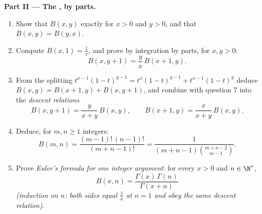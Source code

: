 \begin{problem}
\medskip
\noindent\textbf{Part II --- The , by parts.}
\begin{enumerate}[resume]
  \item Show that $B(x,y)$  exactly for $x > 0$ and $y >
        0$, and that $B(x,y) = B(y,x)$.
  \item Compute $B(x, 1) = \frac1x$, and prove by integration by
        parts, for $x, y > 0$:
        \[
        B(x, y+1) = \frac{y}{x}\,B(x+1, y) .
        \]
  \item From the splitting $t^{x-1}(1-t)^{y-1} =
        t^{x}(1-t)^{y-1} + t^{x-1}(1-t)^{y}$ deduce $B(x,y) =
        B(x+1,y) + B(x,y+1)$, and combine with question 7 into
        the \emph{descent relations}
        \[
        B(x, y+1) = \frac{y}{x+y}\,B(x,y),
        \qquad
        B(x+1, y) = \frac{x}{x+y}\,B(x,y) .
        \]
  \item Deduce, for $m, n \geq 1$ integers:
        \[
        B(m, n) = \frac{(m-1)!\,(n-1)!}{(m+n-1)!}
        = \frac{1}{(m+n-1)\binom{m+n-2}{m-1}} .
        \]
  \item Prove \emph{Euler's formula for one integer argument}:
        for every $x > 0$ and $n \in \N^*$,
        \[
        B(x, n) = \frac{\Gamma(x)\,\Gamma(n)}{\Gamma(x + n)}
        \]
        \emph{(induction on $n$: both sides equal $\frac1x$ at $n
        = 1$ and obey the same descent relation)}.
\end{enumerate}


\end{problem}
